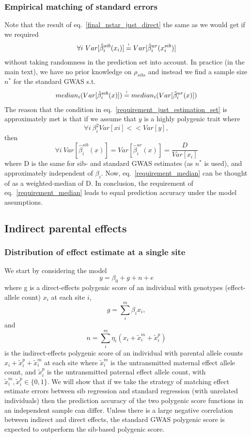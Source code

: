 \documentclass[hidelinks, 12pt]{article}
\begin{document}
\subsubsection{Empirical matching of standard errors}
\label{Empiricalmatchingofstandarderrors}
Note that the result of eq.~\ref{final_nstar_just_direct} the same as we would get if we required 
\begin{equation}
\label{requirement_just_estimation_set}
\forall i~Var[\hat{\beta}_i^{sib}(x_i)] \reqeq Var[\hat{\beta}_i^{ur}(x_i^{sib})]
\end{equation}
without taking randomness in the prediction set into account.  In practice (in the main text), we have no prior knowledge on $\rho_{sibs}$ and instead we find a sample size $n^*$ for the standard GWAS s.t. 
\begin{equation}
\label{requirement_median}
median_i(Var[\hat{\beta}_i^{sib}(x)]) \reqeq median_i(Var[\hat{\beta}_i^{ur}(x)])
\end{equation}
The reason that the condition in eq.~\ref{requirement_just_estimation_set} is approximately met is that if we assume that $y$ is a highly polygenic trait where
$$ \forall i~\beta_i^2Var[xi] << Var[y],$$
then 
$$\forall i~Var[\hat{\beta}_i^{sib}(x)]=Var[\hat{\beta}_i^{ur}(x)]=\frac{D}{Var[x_i]}$$
where D is the same for sib- and standard GWAS estimates (as $n^*$ is used), and approximately independent of $\beta_i$.  Now, eq.~\ref{requirement_median} can be thought of as a weighted-median of D. In conclusion, the requirement of eq.~\ref{requirement_median} leads to equal prediction accuracy under the model assumptions.

\pagebreak

\subsection{Indirect parental effects}
\subsubsection{Distribution of effect estimate at a single site}
We start by considering the model
$$y=\beta_0+g+n+e$$
where g is a direct-effects polygenic score of an individual with genotypes (effect-allele count) $x_i$ at each site $i$,
$$g=\sum_i^m\beta_ix_i,$$ 
and 
$$n=\sum_i^m\eta_i(x_i+\tilde{x}_i^m+\tilde{x}_i^p)$$ 
is the indirect-effects polygenic score of an individual with parental allele counts $x_i+\tilde{x}_i^p+\tilde{x}_i^m$ at each site where $\tilde{x}_i^m$ is the untransmitted maternal effect allele count, and $\tilde{x}_i^p$ is the untransmitted paternal effect allele count, with $\tilde{x}_i^m,\tilde{x}_i^p \in \{0,1\}$.  We will show that if we take the strategy of matching effect estimate errors between sib regression and standard regression (with unrelated individuals) then the prediction accuracy of the two polygenic score functions in an independent sample can differ. Unless there is a large negative correlation between indirect and direct effects, the standard GWAS polygenic score is expected to outperform the sib-based polygenic score.
\end{document}
